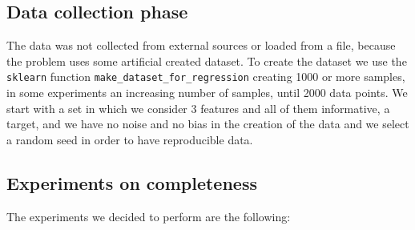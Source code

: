 \documentclass{Configuration_Files/PoliMi3i_thesis}
\begin{document}
\subsection{Data collection phase}
\label{subsec:section_2_1_1}%
The data was not collected from external sources or loaded from a file, because the problem uses some artificial created dataset. To create the dataset we use the \verb|sklearn| function \verb|make_dataset_for_regression| creating 1000 or more samples, in some experiments an increasing number of samples, until 2000 data points. We start with a set in which we consider 3 features and all of them informative, a target, and we have no noise and no bias in the creation of the data and we select a random seed in order to have reproducible data.

\subsection{Experiments on completeness}
\label{subsec:section_2_1_2}%
The experiments we decided to perform are the following:
\end{document}
